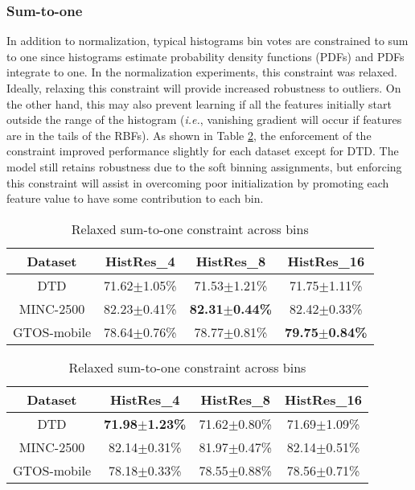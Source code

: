 \documentclass[journal]{IEEEtai}
\begin{document}
	\subsubsection{Sum-to-one}
	In addition to normalization, typical histograms bin votes are constrained to sum to one since histograms estimate probability density functions (PDFs) and PDFs integrate to one. In the normalization experiments, this constraint was relaxed. Ideally, relaxing this constraint will provide increased robustness to outliers. On the other hand, this may also prevent learning if all the features initially start outside the range of the histogram (\textit{i.e.}, vanishing gradient will occur if features are in the tails of the RBFs). As shown in Table \ref{tab:Sum_constraint}, the enforcement of the constraint improved performance slightly for each dataset except for DTD. The model still retains robustness due to the soft binning assignments, but enforcing this constraint will assist in overcoming poor initialization by promoting each feature value to have some contribution to each bin. 
	\begin{table}[t]
	\caption{Test accuracy for each HistRes model \ref{tab:Sum_A}) with and \ref{tab:Sum_B}) without sum-to-one constraint across bins. The result with the best average is bolded.}
	\begin{subtable}{.5\textwidth}
		\centering
		\begin{tabular}{|c|c|c|c|}
			\hline
			Dataset     & HistRes\_4 & HistRes\_8          & HistRes\_16         \\ \hline
			DTD         & 71.62$\pm$1.05\% & 71.53$\pm$1.21\%          & 71.75$\pm$1.11\%          \\ \hline
			MINC-2500   & 82.23$\pm$0.41\% & \textbf{82.31$\pm$0.44\%} & 82.42$\pm$0.33\%          \\ \hline
			GTOS-mobile & 78.64$\pm$0.76\% & 78.77$\pm$0.81\%          & \textbf{79.75$\pm$0.84\%} \\ \hline
		\end{tabular}
		\caption{Enforced sum-to-one constraint across bins}
		\label{tab:Sum_A}
	\end{subtable}
	\begin{subtable}[htb]{.5\textwidth}
		\centering
		\begin{tabular}{|c|c|c|c|}
			\hline
			Dataset     & HistRes\_4          & HistRes\_8 & HistRes\_16 \\ \hline
			DTD         & \textbf{71.98$\pm$1.23\%} & 71.62$\pm$0.80\% & 71.69$\pm$1.09\%  \\ \hline
			MINC-2500   & 82.14$\pm$0.31\%          & 81.97$\pm$0.47\% & 82.14$\pm$0.51\%  \\ \hline
			GTOS-mobile & 78.18$\pm$0.33\%          & 78.55$\pm$0.88\% & 78.56$\pm$0.71\%  \\ \hline
		\end{tabular}
		\caption{Relaxed sum-to-one constraint across bins}
		\label{tab:Sum_B}
	\end{subtable}
	\label{tab:Sum_constraint}
	\end{table}
\end{document}
